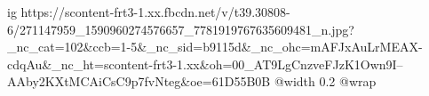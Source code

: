  
 
 
 
 

\ifcmt
  ig https://scontent-frt3-1.xx.fbcdn.net/v/t39.30808-6/271147959_1590960274576657_7781919767635609481_n.jpg?_nc_cat=102&ccb=1-5&_nc_sid=b9115d&_nc_ohc=mAFJxAuLrMEAX-cdqAu&_nc_ht=scontent-frt3-1.xx&oh=00_AT9LgCnzveFJzK1Own9I--AAby2KXtMCAiCsC9p7fvNteg&oe=61D55B0B
  @width 0.2
  @wrap \parpic[r]
\fi
